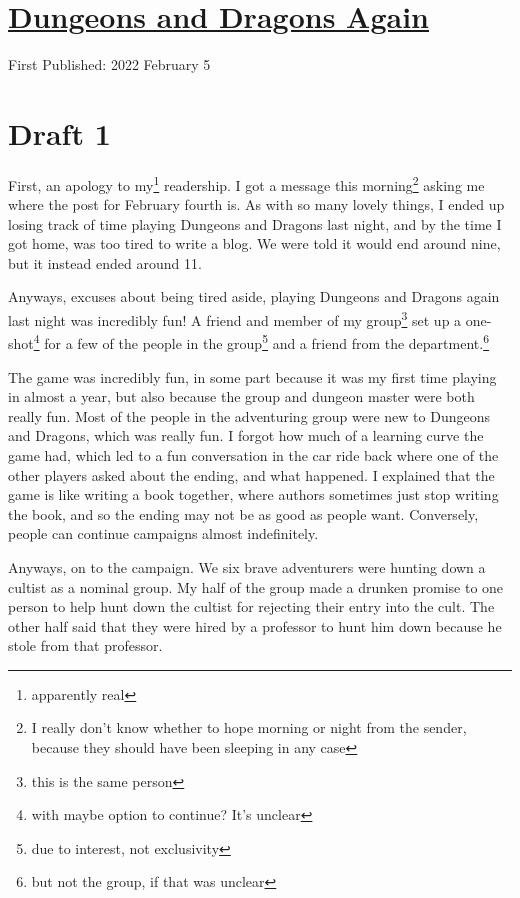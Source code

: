 \documentclass[12pt]{article}[titlepage]
\renewcommand{\,}{\textsuperscript{,}}
\begin{document}
\doublespacing
\section{\href{dungeons-dragons.html}{Dungeons and Dragons Again}}
First Published: 2022 February 5

\section{Draft 1}
First, an apology to my\footnote{apparently real} readership.
I got a message this morning\footnote{I really don't know whether to hope morning or night from the sender, because they should have been sleeping in any case} asking me where the post for February fourth is.
As with so many lovely things, I ended up losing track of time playing Dungeons and Dragons last night, and by the time I got home, was too tired to write a blog.
We were told it would end around nine, but it instead ended around 11.

Anyways, excuses about being tired aside, playing Dungeons and Dragons again last night was incredibly fun!
A friend and member of my group\footnote{this is the same person} set up a one-shot\footnote{with maybe option to continue? It's unclear} for a few of the people in the group\footnote{due to interest, not exclusivity} and a friend from the department.\footnote{but not the group, if that was unclear}

The game was incredibly fun, in some part because it was my first time playing in almost a year, but also because the group and dungeon master were both really fun.
Most of the people in the adventuring group were new to Dungeons and Dragons, which was really fun.
I forgot how much of a learning curve the game had, which led to a fun conversation in the car ride back where one of the other players asked about the ending, and what happened.
I explained that the game is like writing a book together, where authors sometimes just stop writing the book, and so the ending may not be as good as people want.
Conversely, people can continue campaigns almost indefinitely.

Anyways, on to the campaign.
We six brave adventurers were hunting down a cultist as a nominal group.
My half of the group made a drunken promise to one person to help hunt down the cultist for rejecting their entry into the cult.
The other half said that they were hired by a professor to hunt him down because he stole from that professor.
\end{document}
